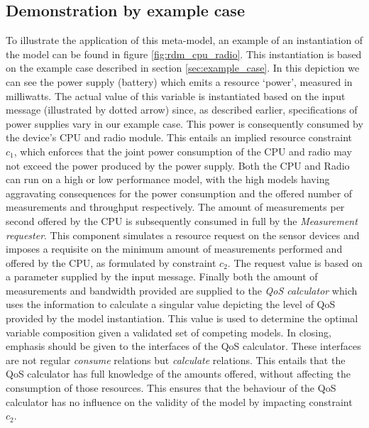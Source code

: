 \subsection{Demonstration by example case}
To illustrate the application of this meta-model, an example of an instantiation of the model can be found in figure \ref{fig:rdm_cpu_radio}. This instantiation is based on the example case described in section \ref{sec:example_case}. In this depiction we can see the power supply (battery) which emits a resource `power', measured in milliwatts. The actual value of this variable is instantiated based on the input message (illustrated by dotted arrow) since, as described earlier, specifications of power supplies vary in our example case. This power is consequently consumed by the device's CPU and radio module. This entails an implied resource constraint $c_1$, which enforces that the joint power consumption of the CPU and radio may not exceed the power produced by the power supply. Both the CPU and Radio can run on a high or low performance model, with the high models having aggravating consequences for the power consumption and the offered number of measurements and throughput respectively. The amount of measurements per second offered by the CPU is subsequently consumed in full by the \emph{Measurement requester}. This component simulates a resource request on the sensor devices and imposes a requisite on the minimum amount of measurements performed and offered by the CPU, as formulated by constraint $c_2$. The request value is based on a parameter supplied by the input message. Finally both the amount of measurements and bandwidth provided are supplied to the \emph{QoS calculator} which uses the information to calculate a singular value depicting the level of QoS provided by the model instantiation. This value is used to determine the optimal variable composition given a validated set of competing models. In closing, emphasis should be given to the interfaces of the QoS calculator. These interfaces are not regular \emph{consume} relations but \emph{calculate} relations. This entails that the QoS calculator has full knowledge of the amounts offered, without affecting the consumption of those resources. This ensures that the behaviour of the QoS calculator has no influence on the validity of the model by impacting constraint $c_2$.


